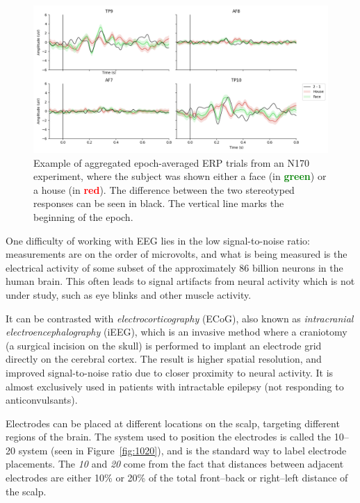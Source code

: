     \begin{figure}
        \centering
        \includegraphics[trim=0 0 80 0, clip, width=14cm]{img/n170_viz.png}
        \caption{Example of aggregated epoch-averaged ERP trials from an N170 experiment, where the subject was shown either a face (in \textcolor{green}{\textbf{green}}) or a house (in \textcolor{red}{\textbf{red}}). The difference between the two stereotyped responses can be seen in black. The vertical line marks the beginning of the epoch.}\label{figure:n170}
    \end{figure}

    One difficulty of working with EEG lies in the low signal-to-noise ratio: measurements are on the order of microvolts, and what is being measured is the electrical activity of some subset of the approximately 86 billion neurons in the human brain. This often leads to signal artifacts from neural activity which is not under study, such as eye blinks and other muscle activity.

    It can be contrasted with \emph{electrocorticography} (ECoG), also known as \emph{intracranial electroencephalography} (iEEG), which is an invasive method where a craniotomy (a surgical incision on the skull) is performed to implant an electrode grid directly on the cerebral cortex. The result is higher spatial resolution, and improved signal-to-noise ratio due to closer proximity to neural activity. It is almost exclusively used in patients with intractable epilepsy (not responding to anticonvulsants).

    Electrodes can be placed at different locations on the scalp, targeting different regions of the brain. The system used to position the electrodes is called the 10–20 system (seen in Figure~\ref{fig:1020}), and is the standard way to label electrode placements. The \emph{10} and \emph{20} come from the fact that distances between adjacent electrodes are either 10\% or 20\% of the total front–back or right–left distance of the scalp.

